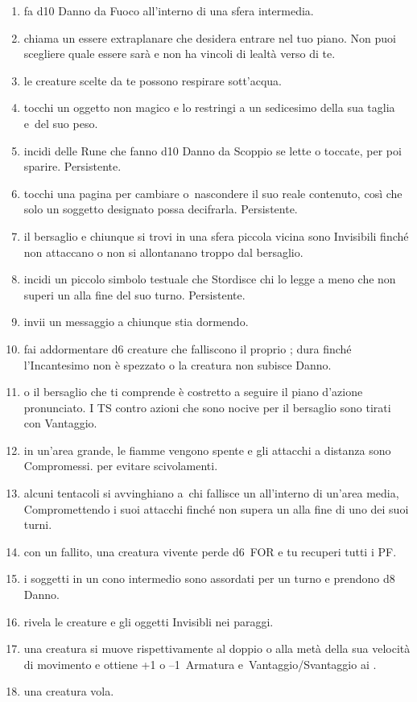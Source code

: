\documentclass[itdr]{subfiles}
\begin{document}
\begin{enumerate}
	\item {} fa d10 Danno da Fuoco all'interno di una sfera intermedia.
	\item {} chiama un essere extraplanare che desidera entrare nel tuo piano. Non puoi scegliere quale essere sarà e non ha vincoli di lealtà verso di te.
	\item {} le creature scelte da te possono respirare sott'acqua.
	\item {} tocchi un oggetto non magico e lo restringi a un sedicesimo della sua taglia e~del suo peso.
	\item {} incidi delle Rune che fanno d10 Danno da Scoppio se lette o toccate, per poi sparire. Persistente.
	\item {} tocchi una pagina per cambiare o~nascondere il suo reale contenuto, così che solo un soggetto designato possa decifrarla. Persistente.
	\item {} il bersaglio e chiunque si trovi in una sfera piccola vicina sono Invisibili finché non attaccano o non si allontanano troppo dal bersaglio.
	\item {} incidi un piccolo simbolo testuale che Stordisce chi lo legge a meno che non superi un  alla fine del suo turno. Persistente.
	\item {} invii un messaggio a chiunque stia dormendo.
	\item {} fai addormentare d6 creature che falliscono il proprio ; dura finché l'Incantesimo non è spezzato o la creatura non subisce Danno.
	\item {}  o il bersaglio che ti comprende è costretto a seguire il piano d'azione pronunciato. I TS contro azioni che sono nocive per il bersaglio sono tirati con Vantaggio.
	\item {} in un'area grande, le fiamme vengono spente e gli attacchi a distanza sono Compromessi.  per evitare scivolamenti.
	\item {} alcuni tentacoli si avvinghiano a~chi fallisce un  all'interno di un'area media, Compromettendo i suoi attacchi finché non supera un  alla fine di uno dei suoi turni.
	\item {} con un  fallito, una creatura vivente perde d6~FOR e tu recuperi tutti i PF.
	\item {} i soggetti in un cono intermedio sono assordati per un turno e prendono d8 Danno.
	\item {} rivela le creature e gli oggetti Invisibli nei paraggi.
	\item {} una creatura si muove rispettivamente al doppio o alla metà della sua velocità di movimento e ottiene +1 o --1~Armatura e~Vantaggio/Svantaggio ai .
	\item {} una creatura vola.
\end{enumerate}
\end{document}
